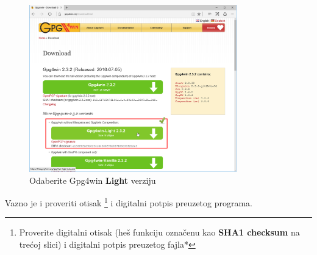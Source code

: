 \documentclass[a4paper,11pt]{article}
\begin{document}
\newpage
\begin{figure}[!t]
	\begin{center}
		\includegraphics[width=9cm]{03_Download_Gpg4wi_Light.png}
		\caption{Odaberite Gpg4win \textbf{Light} verziju}
		\label{initialscreen}
	\end{center}
\end{figure}
Vazno je i proveriti otisak %
\footnote{Proverite digitalni otisak (he\v{s} funkciju ozna\v{c}enu kao \textbf{SHA1 checksum} na tre\'{c}oj slici) i digitalni potpis preuzetog fajla*} i digitalni potpis preuzetog programa.
\end{document}
